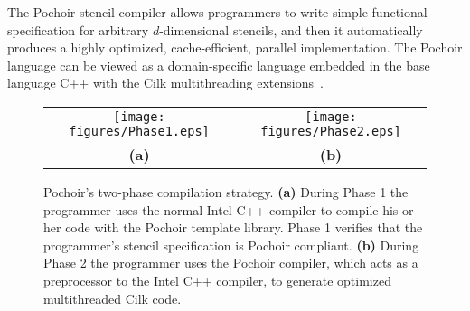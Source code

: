 The Pochoir stencil compiler allows programmers to write simple
functional specification for arbitrary $d$-dimensional stencils, and
then it automatically produces a highly optimized, cache-efficient,
parallel implementation.  The Pochoir language can be viewed as a
domain-specific language \cite{Hudak96, MernikHeSl05,
  vanDeursenKlVi00} embedded in the base language C++ with the Cilk
multithreading extensions~\cite{IntelCilkPlus10}.

\begin{figure*}[t]
\centering
\begin{tabular}{c@{\hspace*{1cm}}c}
\texttt{[image: figures/Phase1.eps]}
&
\texttt{[image: figures/Phase2.eps]}\\
\textbf{(a)} & \textbf{(b)}
\end{tabular}
\caption{ Pochoir's two-phase compilation strategy.  \textbf{(a)}
  During Phase 1 the programmer uses the normal Intel C++ compiler to
  compile his or her code with the Pochoir template library.  Phase 1
  verifies that the programmer's stencil specification is Pochoir
  compliant.  \textbf{(b)} During Phase 2 the programmer uses the
  Pochoir compiler, which acts as a preprocessor to the Intel C++
  compiler, to generate optimized multithreaded Cilk code.}

\label{fig:phases}
\end{figure*}

